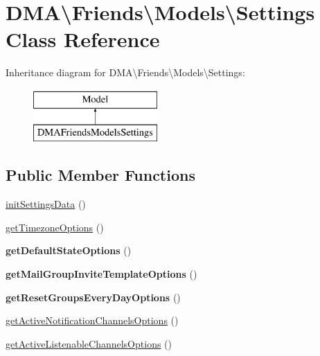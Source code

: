 \hypertarget{classDMA_1_1Friends_1_1Models_1_1Settings}{\section{D\+M\+A\textbackslash{}Friends\textbackslash{}Models\textbackslash{}Settings Class Reference}
\label{classDMA_1_1Friends_1_1Models_1_1Settings}
}
Inheritance diagram for D\+M\+A\textbackslash{}Friends\textbackslash{}Models\textbackslash{}Settings\+:\begin{figure}[H]
\begin{center}
\leavevmode
\includegraphics[height=2.000000cm]{d1/d8a/classDMA_1_1Friends_1_1Models_1_1Settings}
\end{center}
\end{figure}
\subsection*{Public Member Functions}
\begin{DoxyCompactItemize}
\item 
\hyperlink{classDMA_1_1Friends_1_1Models_1_1Settings_a182b5e2b83cfc057c1cd31499ad9e244}{init\+Settings\+Data} ()
\item 
\hyperlink{classDMA_1_1Friends_1_1Models_1_1Settings_a347eae65e8aeb114767d5e4fc8542fea}{get\+Timezone\+Options} ()
\item 
\hypertarget{classDMA_1_1Friends_1_1Models_1_1Settings_a89a0d979d3ba9338c0ce304255a56bbb}{{\bfseries get\+Default\+State\+Options} ()}\label{classDMA_1_1Friends_1_1Models_1_1Settings_a89a0d979d3ba9338c0ce304255a56bbb}

\item 
\hypertarget{classDMA_1_1Friends_1_1Models_1_1Settings_aafef2e58559c6053550fe133b900246b}{{\bfseries get\+Mail\+Group\+Invite\+Template\+Options} ()}\label{classDMA_1_1Friends_1_1Models_1_1Settings_aafef2e58559c6053550fe133b900246b}

\item 
\hypertarget{classDMA_1_1Friends_1_1Models_1_1Settings_ac88752cae719c48bde66c9cb2f945952}{{\bfseries get\+Reset\+Groups\+Every\+Day\+Options} ()}\label{classDMA_1_1Friends_1_1Models_1_1Settings_ac88752cae719c48bde66c9cb2f945952}

\item 
\hyperlink{classDMA_1_1Friends_1_1Models_1_1Settings_a8c2bad0fb18f5e501d3318eba7379609}{get\+Active\+Notification\+Channels\+Options} ()
\item 
\hyperlink{classDMA_1_1Friends_1_1Models_1_1Settings_a140721a33440c666426139d6317bd357}{get\+Active\+Listenable\+Channels\+Options} ()
\end{DoxyCompactItemize}
